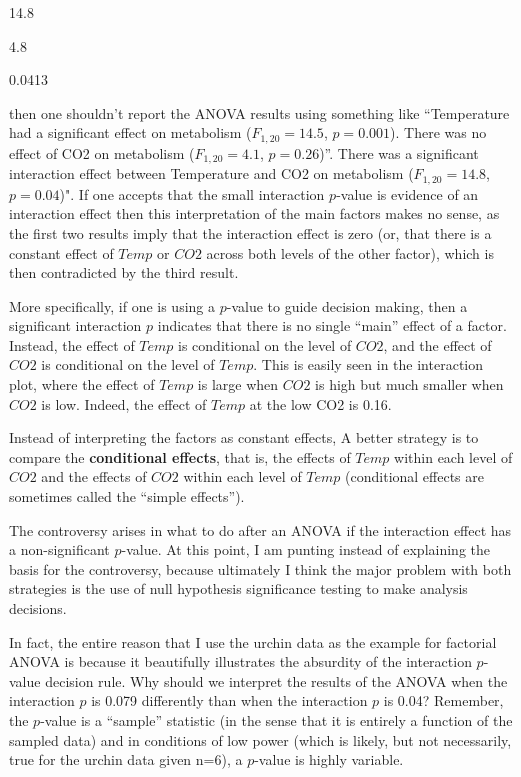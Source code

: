 \documentclass[]{book}
\begin{document}
14.8

4.8

0.0413

then one shouldn't report the ANOVA results using something like ``Temperature had a significant effect on metabolism (\(F_{1,20} = 14.5\), \(p=0.001\)). There was no effect of CO2 on metabolism (\(F_{1,20} = 4.1\), \(p=0.26\))''. There was a significant interaction effect between Temperature and CO2 on metabolism (\(F_{1,20} = 14.8\), \(p=0.04\))". If one accepts that the small interaction \(p\)-value is evidence of an interaction effect then this interpretation of the main factors makes no sense, as the first two results imply that the interaction effect is zero (or, that there is a constant effect of \(Temp\) or \(CO2\) across both levels of the other factor), which is then contradicted by the third result.

More specifically, if one is using a \(p\)-value to guide decision making, then a significant interaction \(p\) indicates that there is no single ``main'' effect of a factor. Instead, the effect of \(Temp\) is conditional on the level of \(CO2\), and the effect of \(CO2\) is conditional on the level of \(Temp\). This is easily seen in the interaction plot, where the effect of \(Temp\) is large when \(CO2\) is high but much smaller when \(CO2\) is low. Indeed, the effect of \(Temp\) at the low CO2 is 0.16.

Instead of interpreting the factors as constant effects, A better strategy is to compare the \textbf{conditional effects}, that is, the effects of \(Temp\) within each level of \(CO2\) and the effects of \(CO2\) within each level of \(Temp\) (conditional effects are sometimes called the ``simple effects'').

The controversy arises in what to do after an ANOVA if the interaction effect has a non-significant \(p\)-value. At this point, I am punting instead of explaining the basis for the controversy, because ultimately I think the major problem with both strategies is the use of null hypothesis significance testing to make analysis decisions.

In fact, the entire reason that I use the urchin data as the example for factorial ANOVA is because it beautifully illustrates the absurdity of the interaction \(p\)-value decision rule. Why should we interpret the results of the ANOVA when the interaction \(p\) is 0.079 differently than when the interaction \(p\) is 0.04? Remember, the \(p\)-value is a ``sample'' statistic (in the sense that it is entirely a function of the sampled data) and in conditions of low power (which is likely, but not necessarily, true for the urchin data given n=6), a \(p\)-value is highly variable.
\end{document}
